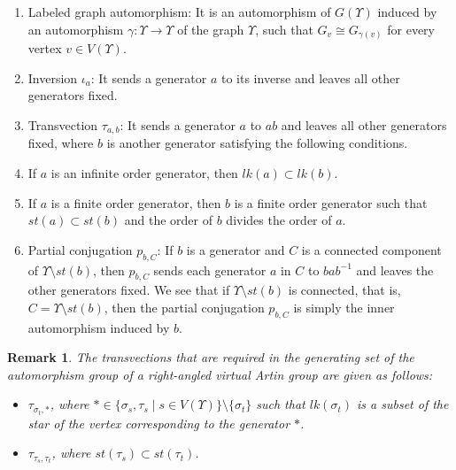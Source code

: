 \documentclass[12pt]{amsart}
\newtheorem{remark}[equation]{Remark}
\numberwithin{equation}{section}
\begin{document}
\begin{enumerate}
\item Labeled graph automorphism: It is an automorphism of $G(\Upsilon)$ induced by an automorphism $\gamma:\Upsilon \to \Upsilon$ of the graph $\Upsilon$, such that $G_v \cong G_{\gamma(v)}$ for every vertex $v \in V(\Upsilon)$.
\item Inversion $\iota_a$: It sends a generator $a$ to its inverse and leaves all other generators fixed.
\item Transvection $\tau_{a,b}$: It sends a generator $a$ to $ab$ and leaves all other generators fixed, where $b$ is another generator satisfying the following conditions. 
\item[] If $a$ is an infinite order generator, then $lk(a) \subset lk(b)$. 
\item[] If $a$ is a finite order generator, then $b$ is a finite order generator such that $st(a) \subset st(b)$ and the order of $b$ divides the order of $a$.
\item Partial conjugation $p_{b, C}$: If $b$ is a generator and $C$ is a connected component of $\Upsilon \setminus  st(b)$, then  $p_{b, C}$ sends each generator $a$ in $C$ to $ba b^{-1}$ and leaves the other generators fixed. We see that if $\Upsilon \setminus st(b)$ is connected, that is, $C=\Upsilon \setminus  st(b)$, then the partial conjugation $p_{b, C}$ is simply the inner automorphism induced by $b$.
\end{enumerate}

\begin{remark}\label{rmk:trans}
The transvections that are required in the generating set of the automorphism group of a right-angled virtual Artin group are given as follows:
\begin{itemize}
\item $\tau_{\sigma_t, \ast}$, where $\ast \in \{\sigma_s, \tau_s \mid s \in V(\Upsilon)\}\setminus \{\sigma_t\}$ such that $lk(\sigma_t)$ is a subset of the star of the vertex corresponding to the generator $\ast$.
\item $\tau_{\tau_s, \tau_t}$, where $st(\tau_s) \subset st(\tau_t)$.
\end{itemize}
\end{remark}
\medskip
\end{document}
